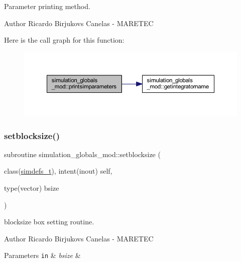 Parameter printing method. 

\begin{DoxyAuthor}{Author}
Ricardo Birjukovs Canelas -\/ M\+A\+R\+E\+T\+EC 
\end{DoxyAuthor}
Here is the call graph for this function\+:\nopagebreak
\begin{figure}[H]
\begin{center}
\leavevmode
\includegraphics[width=350pt]{namespacesimulation__globals__mod_a97c04d0289a9f2d004a9329cb7ab16f0_cgraph}
\end{center}
\end{figure}
\mbox{\label{namespacesimulation__globals__mod_aa65b43534d2d2b6366a4ebc791194805}} 
\subsubsection{\texorpdfstring{setblocksize()}{setblocksize()}}
{\footnotesize\ttfamily subroutine simulation\+\_\+globals\+\_\+mod\+::setblocksize (\begin{DoxyParamCaption}\item[{class(\hyperlink{structsimulation__globals__mod_1_1simdefs__t}{simdefs\+\_\+t}), intent(inout)}]{self,  }\item[{type(vector)}]{bsize }\end{DoxyParamCaption})\hspace{0.3cm}{\ttfamily [private]}}



blocksize box setting routine. 

\begin{DoxyAuthor}{Author}
Ricardo Birjukovs Canelas -\/ M\+A\+R\+E\+T\+EC 
\end{DoxyAuthor}

\begin{DoxyParams}[1]{Parameters}
\mbox{\tt in}  & {\em bsize} & \\
\hline
\end{DoxyParams}
\mbox{\label{namespacesimulation__globals__mod_a412b0779703630189e2ea14e4b390864}} 
